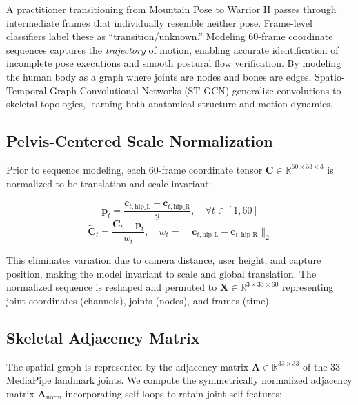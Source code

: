 \documentclass[conference]{IEEEtran}
\begin{document}
A practitioner transitioning from Mountain Pose to Warrior II passes through intermediate
frames that individually resemble neither pose. Frame-level classifiers label these as
``transition/unknown.'' Modeling 60-frame coordinate sequences captures the
\emph{trajectory} of motion, enabling accurate identification of incomplete pose executions
and smooth postural flow verification. By modeling the human body as a graph where joints
are nodes and bones are edges, Spatio-Temporal Graph Convolutional Networks (ST-GCN)
generalize convolutions to skeletal topologies, learning both anatomical structure and motion dynamics.

\subsection{Pelvis-Centered Scale Normalization}

Prior to sequence modeling, each 60-frame coordinate tensor $\mathbf{C} \in
\mathbb{R}^{60\times33\times3}$ is normalized to be translation and scale invariant:

\begin{equation}
\mathbf{p}_t = \frac{\mathbf{c}_{t,\mathrm{hip\_L}} + \mathbf{c}_{t,\mathrm{hip\_R}}}{2},
\quad \forall t \in [1,60]
\label{eq:pelvis}
\end{equation}
\begin{equation}
\tilde{\mathbf{C}}_t = \frac{\mathbf{C}_t - \mathbf{p}_t}{w_t},\quad
w_t = \|\mathbf{c}_{t,\mathrm{hip\_L}} - \mathbf{c}_{t,\mathrm{hip\_R}}\|_2
\label{eq:norm}
\end{equation}

\noindent This eliminates variation due to camera distance, user height, and capture
position, making the model invariant to scale and global translation. The normalized
sequence is reshaped and permuted to $\tilde{\mathbf{X}} \in \mathbb{R}^{3\times33\times60}$
representing joint coordinates (channels), joints (nodes), and frames (time).

\subsection{Skeletal Adjacency Matrix}

The spatial graph is represented by the adjacency matrix $\mathbf{A} \in \mathbb{R}^{33\times33}$
of the 33 MediaPipe landmark joints. We compute the symmetrically normalized adjacency matrix
$\mathbf{A}_{\mathrm{norm}}$ incorporating self-loops to retain joint self-features:
\end{document}
